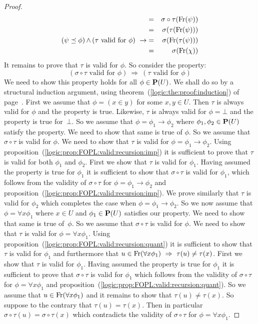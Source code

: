 \begin{proof}
\begin{eqnarray*}
    &=&\sigma\circ\tau(\free(\psi))\\
    &=&\sigma(\tau(\free(\psi)))\\
    \mbox{($\psi\preceq\phi$)$\,\land\,$($\tau$ valid for $\phi$)}\ \rightarrow
    &=&\sigma(\free(\tau(\psi)))\\
    &=&\sigma(\free(\chi))
    \end{eqnarray*}
It remains to prove that $\tau$ is valid for $\phi$. So consider the
property:
    \[
    (\mbox{$\sigma\circ\tau$ valid for
    $\phi$})\ \Rightarrow\ (\mbox{$\tau$ valid for $\phi$})
    \]
We need to show this property holds for all $\phi\in{\bf P}(U)$. We
shall do so by a structural induction argument, using
theorem~(\ref{logic:the:proof:induction}) of
page~\pageref{logic:the:proof:induction}. First we assume that
$\phi=(x\in y)$ for some $x,y\in U$. Then $\tau$ is always valid for
$\phi$ and the property is true. Likewise, $\tau$ is always valid
for $\phi=\bot$ and the property is true for~$\bot$. So we assume
that $\phi=\phi_{1}\to\phi_{2}$ where $\phi_{1},\phi_{2}\in{\bf
P}(U)$ satisfy the property. We need to show that same is true of
$\phi$. So we assume that $\sigma\circ\tau$ is valid for $\phi$. We
need to show that $\tau$ is valid for $\phi=\phi_{1}\to\phi_{2}$.
Using proposition~(\ref{logic:prop:FOPL:valid:recursion:imp}) it is
sufficient to prove that $\tau$ is valid for both $\phi_{1}$ and
$\phi_{2}$. First we show that $\tau$ is valid for $\phi_{1}$.
Having assumed the property is true for $\phi_{1}$ it is sufficient
to show that $\sigma\circ\tau$ is valid for $\phi_{1}$, which
follows from the validity of $\sigma\circ\tau$ for
$\phi=\phi_{1}\to\phi_{2}$ and
proposition~(\ref{logic:prop:FOPL:valid:recursion:imp}). We prove
similarly that $\tau$ is valid for $\phi_{2}$ which completes the
case when $\phi=\phi_{1}\to\phi_{2}$. So we now assume that
$\phi=\forall x\phi_{1}$ where $x\in U$ and $\phi_{1}\in{\bf P}(U)$
satisfies our property. We need to show that same is true of~$\phi$.
So we assume that $\sigma\circ\tau$ is valid for $\phi$. We need to
show that $\tau$ is valid for $\phi=\forall x\phi_{1}$. Using
proposition~(\ref{logic:prop:FOPL:valid:recursion:quant}) it is
sufficient to show that $\tau$ is valid for $\phi_{1}$ and
furthermore that $u\in\mbox{\rm Fr}(\forall x\phi_{1})\ \Rightarrow\
\tau(u)\neq\tau(x)$. First we show that $\tau$ is valid for
$\phi_{1}$. Having assumed the property is true for $\phi_{1}$ it is
sufficient to prove that $\sigma\circ\tau$ is valid for $\phi_{1}$
which follows from the validity of $\sigma\circ\tau$ for
$\phi=\forall x\phi_{1}$ and
proposition~(\ref{logic:prop:FOPL:valid:recursion:quant}). So we
assume that $u\in\mbox{\rm Fr}(\forall x\phi_{1})$ and it remains to show
that $\tau(u)\neq\tau(x)$. So suppose to the contrary that
$\tau(u)=\tau(x)$. Then in particular
$\sigma\circ\tau(u)=\sigma\circ\tau(x)$ which contradicts the
validity of $\sigma\circ\tau$ for $\phi=\forall x\phi_{1}$.
\end{proof}


